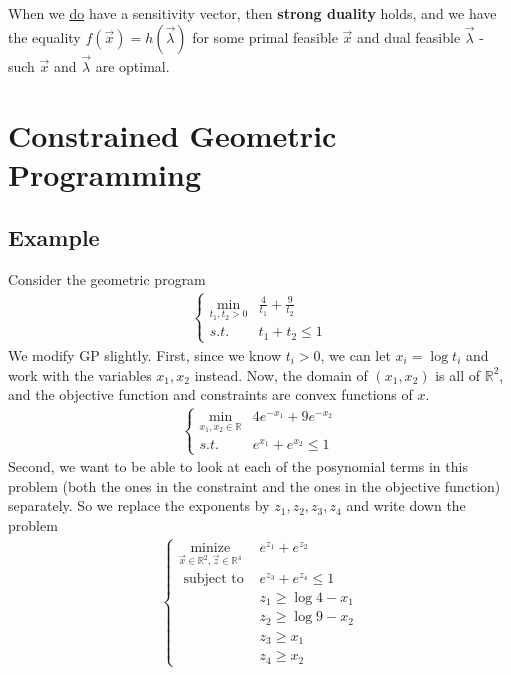 \documentclass[11pt,a4paper]{article}
\begin{document}
When we \underline{do} have a sensitivity vector, then \textbf{strong duality} holds, and we have the equality $f(\vec{x})=h(\vec{\lambda})$ for some primal feasible $\vec{x}$ and dual feasible $\vec{\lambda}$ - such $\vec{x}$ and $\vec{\lambda}$ are optimal.


\section{Constrained Geometric Programming}
\subsection{Example}
Consider the geometric program
\begin{equation}
    \begin{aligned}
        \left\{\begin{matrix}
            \min_{t_1,t_2>0}&\frac{4}{t_1}+\frac{9}{t_2}\\
            s.t.&t_1+t_2\leq 1
        \end{matrix}\right.
    \end{aligned}
    \tag{GP}
\end{equation}
We modify GP slightly. First, since we know $t_i > 0$, we can let $x_i = \log t_i$ and work with the variables $x_1,x_2$ instead. Now, the domain of $(x_1,x_2)$ is all of $\mathbb{R}^2$, and the objective function and constraints are convex functions of $x$.
\begin{equation}
    \begin{aligned}
        \left\{\begin{matrix}
            \min_{x_1,x_2\in \mathbb{R}}&4e^{-x_1}+9e^{-x_2}\\
            s.t.&e^{x_1}+e^{x_2}\leq 1
        \end{matrix}\right.
    \end{aligned}
    \tag{GP'}
\end{equation}
Second, we want to be able to look at each of the posynomial terms in this problem (both the ones in the constraint and the ones in the objective function) separately. So we replace the exponents by $z_1, z_2, z_3, z_4$ and write down the problem
\begin{equation}
    \begin{aligned}
        \begin{cases}\underset{\vec{x} \in \mathbb{R}^2, \vec{z} \in \mathbb{R}^4}{\operatorname{minize}} & e^{z_1}+e^{z_2} \\ \text { subject to } & e^{z_3}+e^{z_4} \leq 1 \\ & z_1 \geq \log 4-x_1 \\ & z_2 \geq \log 9-x_2 \\ & z_3 \geq x_1 \\ & z_4 \geq x_2\end{cases}
    \end{aligned}
    \tag{GP''}
\end{equation}
\end{document}
